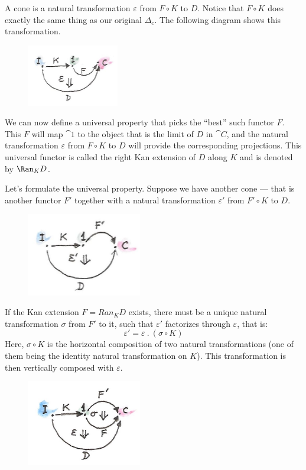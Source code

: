 \noindent
A cone is a natural transformation $\varepsilon$ from $F \circ K$ to
$D$. Notice that $F \circ K$ does exactly the same thing as
our original $\Delta_c$. The following diagram shows this
transformation.

\begin{figure}[H]
\centering
\includegraphics[width=40mm]{images/kan3-e1492120491591.jpg}
\end{figure}

\noindent
We can now define a universal property that picks the ``best'' such
functor $F$. This $F$ will map $\cat{1}$ to the object
that is the limit of $D$ in $\cat{C}$, and the natural
transformation $\varepsilon$ from $F \circ K$ to $D$ will
provide the corresponding projections. This universal functor is called
the right Kan extension of $D$ along $K$ and is denoted by
$\Ran_{K}D$.

Let's formulate the universal property. Suppose we have another cone ---
that is another functor $F'$ together with a natural
transformation $\varepsilon'$ from $F' \circ K$ to
$D$.

\begin{figure}[H]
\centering
\includegraphics[width=50mm]{images/kan31-e1492120512209.jpg}
\end{figure}

\noindent
If the Kan extension $F = Ran_{K}D$ exists, there must be a unique
natural transformation $\sigma$ from $F'$ to it, such
that $\varepsilon'$ factorizes through $\varepsilon$, that is:
\[\varepsilon' = \varepsilon\ .\ (σ \circ K)\]
Here, $\sigma \circ K$ is the horizontal composition of two natural
transformations (one of them being the identity natural transformation
on $K$). This transformation is then vertically composed with
$\varepsilon$.

\begin{figure}[H]
\centering
\includegraphics[width=50mm]{images/kan5.jpg}
\end{figure}

